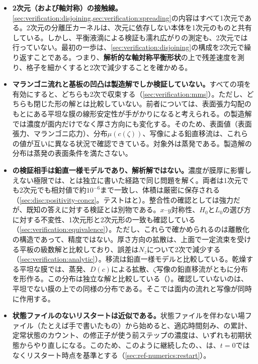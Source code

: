 \begin{itemize}
  \item \textbf{2次元（および軸対称）の接触線。}\cref{sec:verification:disjoining,sec:verification:spreading}の内容はすべて1次元である。2次元の分離圧カーネルは、次元に依存しない本体を1次元のものと共有している。しかし、平衡液滴による検証も濡れ広がりの測定も、2次元では行っていない。最初の一歩は、\cref{sec:verification:disjoining}の構成を2次元で繰り返すことである。つまり、\textbf{解析的な軸対称平衡形状}の上で残差速度を測り、格子を細かくすると2次で減少することを確かめる。
  \item \textbf{マランゴニ流れと基板の凹凸は製造解でしか検証していない。}すべての項を有効にすると、どちらも2次で収束する（\cref{sec:verification:mms}）。ただし、どちらも閉じた形の解とは比較していない。前者については、表面張力勾配のもとにある平坦な膜の線形安定性が手がかりになると考えられる。の製造解では濃度が面内だけでなく厚さ方向にも変化する。そのため、表面値（表面張力、マランゴニ応力）、分布$\mu(c(\zeta))$、写像による鉛直移流は、これらの値が互いに異なる状況で確認できている。対象外は蒸発である。製造解の分布は蒸発の表面条件を満たさない。
  \item \textbf{の検証相手は鉛直一様モデルであり、解析解ではない。}濃度が膜厚に影響しえない極限では、とは独立に書いた経路で同じ問題を解く。両者は1次元でも2次元でも相対値で約$10^{-6}$まで一致し、体積は厳密に保存される（\cref{sec:disc:positivity-concz}。テストはと）。整合性の確認としては強力だが、既知の答えに対する検証とは別物である。$x$--$y$対称性、$H_0$と$L_0$の選び方に対する不変性、1次元形と2次元形の一致も確認している（\cref{sec:verification:equivalence}）。ただし、これらで確かめられるのは離散化の構造であって、精度ではない。厚さ方向の拡散は、上面で一定流束を受ける平板の級数解と比較しており、誤差は$N_z$について2次で減少する（\cref{sec:verification:analytic}）。移流は鉛直一様モデルと比較している。乾燥する平坦な膜では、蒸発、$D(c)$による拡散、$\zeta$写像の鉛直移流がともに分布を形作る。この分布は独立な解と比較している（）。確認していないのは、平坦でない膜の上での同様の分布である。そこでは面内の流れと写像が同時に作用する。
  \item \textbf{状態ファイルのないリスタートは近似である。}状態ファイルを伴わない場ファイル（たとえば手で書いたもの）から始めると、適応時間刻み、の累計、定常状態のカウント、の修正子が使う前ステップの濃度は、いずれも初期状態からやり直しになる。このため、このように継続したの、、は、$t = 0$ではなくリスタート時点を基準とする（\cref{sec:ref-numerics:restart}）。

\end{itemize}
